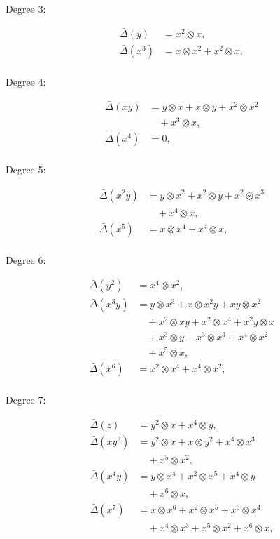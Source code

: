 Degree 3:

\[
\begin{aligned}
\bar\Delta(y)&=x^{2}\otimes x,\\
\bar\Delta(x^{3})&=x\otimes x^{2}+x^{2}\otimes x,\\
\end{aligned}
\]

Degree 4:

\[
\begin{aligned}
\bar\Delta(xy)&=y\otimes x+x\otimes y+x^{2}\otimes x^{2}\\
&\quad+x^{3}\otimes x,\\
\bar\Delta(x^{4})&=0,\\
\end{aligned}
\]

Degree 5:

\[
\begin{aligned}
\bar\Delta(x^{2}y)&=y\otimes x^{2}+x^{2}\otimes y+x^{2}\otimes x^{3}\\
&\quad+x^{4}\otimes x,\\
\bar\Delta(x^{5})&=x\otimes x^{4}+x^{4}\otimes x,\\
\end{aligned}
\]

Degree 6:

\[
\begin{aligned}
\bar\Delta(y^{2})&=x^{4}\otimes x^{2},\\
\bar\Delta(x^{3}y)&=y\otimes x^{3}+x\otimes x^{2}y+xy\otimes x^{2}\\
&\quad+x^{2}\otimes xy+x^{2}\otimes x^{4}+x^{2}y\otimes x\\
&\quad+x^{3}\otimes y+x^{3}\otimes x^{3}+x^{4}\otimes x^{2}\\
&\quad+x^{5}\otimes x,\\
\bar\Delta(x^{6})&=x^{2}\otimes x^{4}+x^{4}\otimes x^{2},\\
\end{aligned}
\]

Degree 7:

\[
\begin{aligned}
\bar\Delta(z)&=y^{2}\otimes x+x^{4}\otimes y,\\
\bar\Delta(xy^{2})&=y^{2}\otimes x+x\otimes y^{2}+x^{4}\otimes x^{3}\\
&\quad+x^{5}\otimes x^{2},\\
\bar\Delta(x^{4}y)&=y\otimes x^{4}+x^{2}\otimes x^{5}+x^{4}\otimes y\\
&\quad+x^{6}\otimes x,\\
\bar\Delta(x^{7})&=x\otimes x^{6}+x^{2}\otimes x^{5}+x^{3}\otimes x^{4}\\
&\quad+x^{4}\otimes x^{3}+x^{5}\otimes x^{2}+x^{6}\otimes x,\\
\end{aligned}
\]


